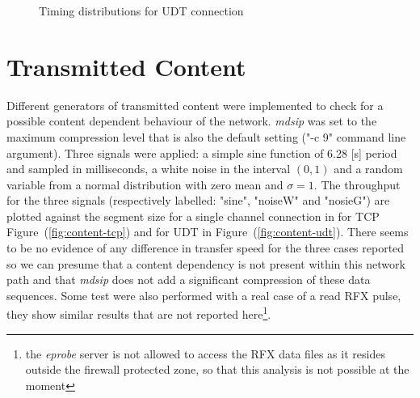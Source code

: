 \documentclass[10pt,a4paper]{article}
\begin{document}
\begin{figure}[ht]
\centerline{
}
\caption[]
{ Timing distributions for UDT connection }
\label{fig:distr-udt}
\end{figure}

\section{Transmitted Content}

Different generators of transmitted content were implemented to check for a possible content dependent behaviour of the network.
\emph{mdsip} was set to the maximum compression level that is also the default setting ("-c 9" command line argument).
Three signals were applied: a simple sine function of 6.28 [s] period and sampled in milliseconds, a white noise in the interval $(0,1)$ and a random variable from a normal distribution with zero mean and $\sigma=1$.
The throughput for the three signals (respectively labelled: "sine", "noiseW" and "nosieG") are plotted against the segment size for a single channel connection in for TCP Figure~(\ref{fig:content-tcp}) and for UDT in Figure~(\ref{fig:content-udt}).
There seems to be no evidence of any difference in transfer speed for the three cases reported so we can presume that a content dependency is not present within this network path and that \emph{mdsip} does not add a significant compression of these data sequences. Some test were also performed with a real case of a read RFX pulse, they show similar results that are not reported here\footnote{the \emph{eprobe} server is not allowed to access the RFX data files as it resides outside the firewall protected zone, so that this analysis is not possible at the moment}.
\end{document}
